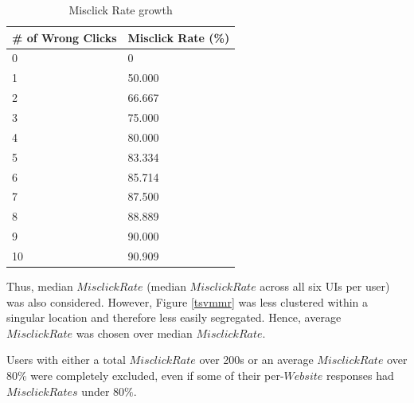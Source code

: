 \documentclass[12pt,twoside]{reedthesis}
\begin{document}
    \begin{table}[H]
            \centering
            \begin{tabular}{| p{3.5cm} | p{3.5cm} |}
                \hline
                \# of Wrong Clicks & Misclick Rate (\%)\\
                \hline
                0 & 0\\
                \hline
                1 & 50.000\\
                \hline
                2 & 66.667\\
                \hline
                3 & 75.000\\
                \hline
                4 & 80.000\\
                \hline
                5 & 83.334\\
                \hline
                6 & 85.714\\
                \hline
                7 & 87.500\\
                \hline
                8 & 88.889\\
                \hline
                9 & 90.000\\
                \hline
                10 & 90.909\\
                \hline
            \end{tabular}
            \caption{Misclick Rate growth}
            \label{mr_growth}
    \end{table}
    
    Thus, median $MisclickRate$ (median $MisclickRate$ across all six UIs per user) was also considered. However, Figure \ref{tsvmmr} was less clustered within a singular location and therefore less easily segregated. Hence, average $MisclickRate$ was chosen over median $MisclickRate$.

    Users with either a total $MisclickRate$ over 200s or an average $MisclickRate$ over 80\% were completely excluded, even if some of their per-$Website$ responses had $MisclickRates$ under $80\%$.

    
\end{document}
